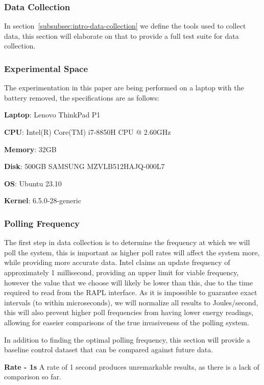 \subsubsection{Data Collection}
In section~\ref{subsubsec:intro-data-collection} we define the tools used to collect data, this section will elaborate
on that to provide a full test suite for data collection.

\subsubsection{Experimental Space}
The experimentation in this paper are being performed on a laptop with the battery removed, the specifications are as
follows:

\textbf{Laptop}: Lenovo ThinkPad P1

\textbf{CPU}: Intel(R) Core(TM) i7-8850H CPU @ 2.60GHz

\textbf{Memory}: 32GB

\textbf{Disk}: 500GB SAMSUNG MZVLB512HAJQ-000L7

\textbf{OS}: Ubuntu 23.10

\textbf{Kernel}: 6.5.0-28-generic

\subsubsection{Polling Frequency}
The first step in data collection is to determine the frequency at which we will poll the system, this is important as
higher poll rates will affect the system more, while providing more accurate data.
Intel claims an update frequency of approximately 1 millisecond\cite{RAPLInterface}, providing an upper limit for viable
frequency, however the value that we choose will likely be lower than this, due to the time required to read from the
RAPL interface.
As it is impossible to guarantee exact intervals (to within microseconds), we will normalize all results to
Joules/second, this will also prevent higher poll frequencies from having lower energy readings, allowing for easeier
comparisons of the true invasiveness of the polling system.

In addition to finding the optimal polling frequency, this section will provide a baseline control dataset that can be
compared against future data.

\textbf{Rate - 1s}
A rate of 1 second produces unremarkable results, as there is a lack of comparison so far.

